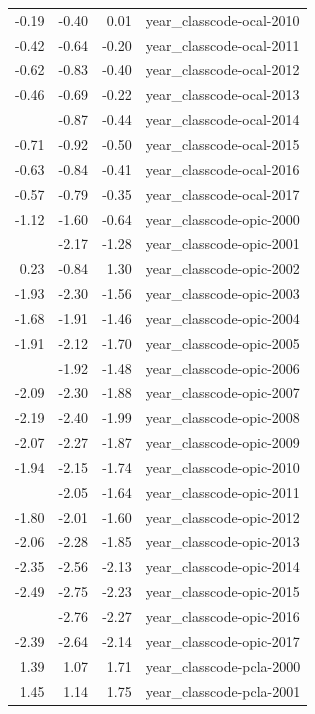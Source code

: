 \documentclass[]{article}
\begin{document}
\begin{longtable}[t]{rrrl}
-0.19 & -0.40 & 0.01 & year\_classcode-ocal-2010\\
-0.42 & -0.64 & -0.20 & year\_classcode-ocal-2011\\
-0.62 & -0.83 & -0.40 & year\_classcode-ocal-2012\\
-0.46 & -0.69 & -0.22 & year\_classcode-ocal-2013\\
\addlinespace
-0.65 & -0.87 & -0.44 & year\_classcode-ocal-2014\\
-0.71 & -0.92 & -0.50 & year\_classcode-ocal-2015\\
-0.63 & -0.84 & -0.41 & year\_classcode-ocal-2016\\
-0.57 & -0.79 & -0.35 & year\_classcode-ocal-2017\\
-1.12 & -1.60 & -0.64 & year\_classcode-opic-2000\\
\addlinespace
-1.72 & -2.17 & -1.28 & year\_classcode-opic-2001\\
0.23 & -0.84 & 1.30 & year\_classcode-opic-2002\\
-1.93 & -2.30 & -1.56 & year\_classcode-opic-2003\\
-1.68 & -1.91 & -1.46 & year\_classcode-opic-2004\\
-1.91 & -2.12 & -1.70 & year\_classcode-opic-2005\\
\addlinespace
-1.70 & -1.92 & -1.48 & year\_classcode-opic-2006\\
-2.09 & -2.30 & -1.88 & year\_classcode-opic-2007\\
-2.19 & -2.40 & -1.99 & year\_classcode-opic-2008\\
-2.07 & -2.27 & -1.87 & year\_classcode-opic-2009\\
-1.94 & -2.15 & -1.74 & year\_classcode-opic-2010\\
\addlinespace
-1.84 & -2.05 & -1.64 & year\_classcode-opic-2011\\
-1.80 & -2.01 & -1.60 & year\_classcode-opic-2012\\
-2.06 & -2.28 & -1.85 & year\_classcode-opic-2013\\
-2.35 & -2.56 & -2.13 & year\_classcode-opic-2014\\
-2.49 & -2.75 & -2.23 & year\_classcode-opic-2015\\
\addlinespace
-2.52 & -2.76 & -2.27 & year\_classcode-opic-2016\\
-2.39 & -2.64 & -2.14 & year\_classcode-opic-2017\\
1.39 & 1.07 & 1.71 & year\_classcode-pcla-2000\\
1.45 & 1.14 & 1.75 & year\_classcode-pcla-2001\\

\end{longtable}
\end{document}
